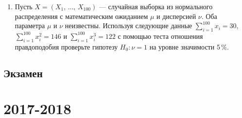 \documentclass[12pt, a4paper]{article}\usepackage[]{graphicx}\usepackage[]{color}
\begin{document}
\begin{enumerate}
\item Пусть $X = (X_1, \, \ldots, \, X_{100})$ — случайная выборка из нормального распределения с математическим ожиданием $\mu$ и дисперсией $\nu$. Оба параметра $\mu$ и $\nu$ неизвестны. Используя следующие данные $\sum_{i=1}^{100}x_i = 30$, $\sum_{i=1}^{100}x_i^2 = 146$ и $\sum_{i=1}^{100}x_i^3 = 122$ с помощью теста отношения правдоподобия проверьте гипотезу $H_0 \colon \nu = 1$ на уровне значимости 5\,\%.

\end{enumerate}


\subsection{Экзамен}





\section{2017-2018}
\end{document}
